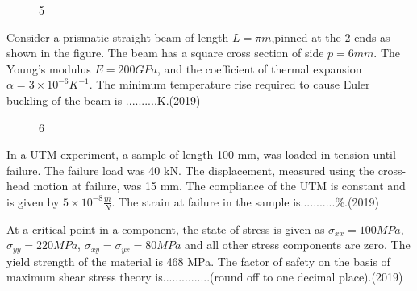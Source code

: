     \begin{figure}[!ht]
        \centering
        \caption{5}
    \end{figure}
    \item Consider a prismatic straight beam of length $L= \pi m$,pinned at the 2 ends as shown in the figure. The beam has a square cross section of side $p = 6mm$. The Young's modulus $E = 200GPa$, and the coefficient of thermal expansion $\alpha = 3\times 10^{-6}K^{-1}$. The minimum temperature rise required to cause Euler buckling of the beam is ..........K.\hfill (2019)
    \begin{figure}[!ht]
        \centering
        \caption{6}
    \end{figure}
    \item In a UTM experiment, a sample of length 100 mm, was loaded in tension until failure. The failure load was 40 kN. The displacement, measured using the cross-head motion at failure, was 15 mm. The compliance of the UTM is constant and is given by $5\times 10^{-8}\frac{m}{N}$. The strain at failure in the sample is...........\%.\hfill (2019)
    \item At a critical point in a component, the state of stress is given as $\sigma_{xx}=100MPa$, $\sigma_{yy} = 220MPa$, $\sigma_{xy}= \sigma_{yx}=80MPa$ and all other stress components are zero. The yield strength of the material is 468 MPa. The factor of safety on the basis of maximum shear stress theory is...............(round off to one decimal place).\hfill (2019)  

